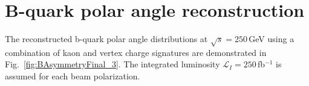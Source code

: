 


\section*{B-quark polar angle reconstruction}

The reconstructed b-quark polar angle distributions at $\sqrt{s} = 250$\,GeV using a combination of kaon and vertex charge signatures are demonstrated in Fig.~\ref{fig:BAsymmetryFinal_3}. The integrated luminosity $\mathcal{L}_I = 250$\,fb$^{-1}$ is assumed for each beam polarization.
